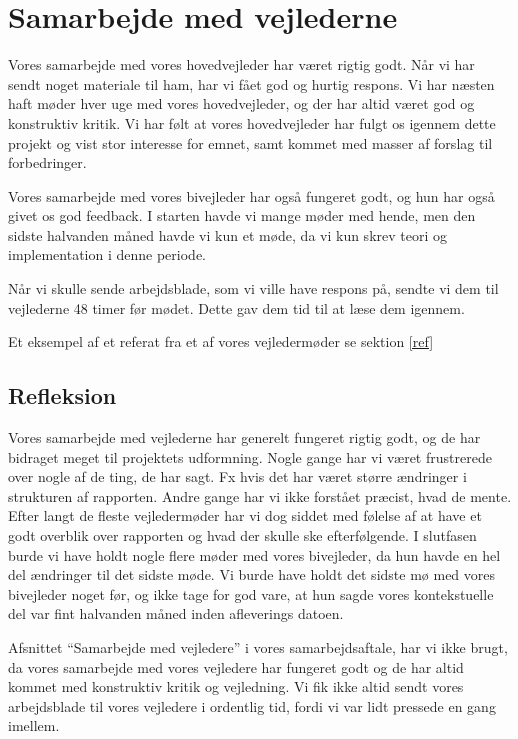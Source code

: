 \section{Samarbejde med vejlederne}
\label{H8R}

Vores samarbejde med vores hovedvejleder har v\ae{}ret rigtig godt. 
N\aa{}r vi har sendt noget materiale til ham, har vi f\aa{}et god og hurtig respons. 
Vi har n\ae{}sten haft m\o{}der hver uge med vores hovedvejleder, og der har altid v\ae{}ret god og
konstruktiv kritik. 
Vi har f\o{}lt at vores hovedvejleder har fulgt os igennem dette projekt og vist stor interesse for emnet, samt kommet med masser af forslag til forbedringer.

Vores samarbejde med vores bivejleder har ogs\aa{} fungeret godt, og hun har ogs\aa{} givet os god feedback. 
I starten havde vi mange m\o{}der med hende, men den sidste halvanden m\aa{}ned havde vi kun et m\o{}de, da vi kun skrev teori og implementation i denne periode.

N\aa{}r vi skulle sende arbejdsblade, som vi ville have respons p\aa{}, sendte vi dem til vejlederne 48 timer f\o{}r m\o{}det. Dette gav dem tid til at l\ae{}se dem igennem.

Et eksempel af et referat fra et af vores vejlederm\o{}der se sektion \ref{ref}

\subsection{Refleksion}
Vores samarbejde med vejlederne har generelt fungeret rigtig godt, og de har bidraget meget til projektets udformning. 
Nogle gange har vi v\ae{}ret frustrerede over nogle af de ting, de har sagt. 
Fx hvis det har v\ae{}ret st\o{}rre \ae{}ndringer i strukturen af rapporten. Andre gange har vi ikke forst\aa{}et pr\ae{}cist, hvad de
mente. 
Efter langt de fleste vejlederm\o{}der har vi dog siddet med f\o{}lelse af at have et godt overblik over rapporten og hvad der skulle ske efterf\o{}lgende. 
I slutfasen burde vi have holdt nogle flere m\o{}der med vores bivejleder, da hun havde en hel del \ae{}ndringer til det sidste m\o{}de. Vi burde have holdt det sidste m\o{} med vores bivejleder noget f\o{}r, og ikke tage for god vare, at hun sagde vores kontekstuelle del var fint halvanden m\aa{}ned inden afleverings datoen.


Afsnittet ``Samarbejde med vejledere'' i vores samarbejdsaftale, har vi ikke brugt, da vores samarbejde med vores vejledere har fungeret godt og de har altid kommet med konstruktiv kritik og vejledning. 
Vi fik ikke altid sendt vores arbejdsblade til vores vejledere i ordentlig tid, fordi vi var lidt pressede en gang imellem.

